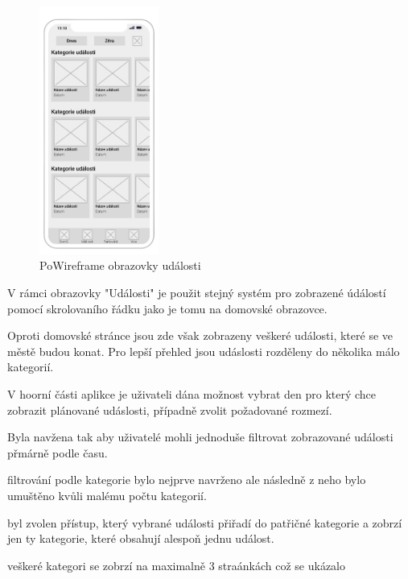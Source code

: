 
\begin{figure}
  \centering
  \includegraphics[width=0.35\textwidth]{events_wireframe.png}
  \caption{PoWireframe obrazovky události}
\end{figure}

V rámci obrazovky "Události" je použit stejný systém pro zobrazené údálostí pomocí skrolovaního řádku jako je tomu na domovské obrazovce.

Oproti domovské stránce jsou zde však zobrazeny veškeré události, které se ve městě budou konat. Pro lepší přehled jsou udáslosti rozděleny 
do několika málo kategorií.

V hoorní části aplikce je uživateli dána možnost vybrat den pro který chce zobrazit plánované udáslosti, případně zvolit požadované rozmezí.



Byla navžena tak aby uživatelé mohli jednoduše filtrovat zobrazované události přmárně podle času.

filtrování podle kategorie bylo nejprve navrženo ale následně z neho bylo umuštěno kvůli malému počtu kategorií.

byl zvolen přístup, který vybrané události přiřadí do patřičné kategorie a zobrzí jen ty kategorie, které obsahují alespoň jednu událost.

veškeré kategori se zobrzí na maximalně 3 straánkách což se ukázalo


